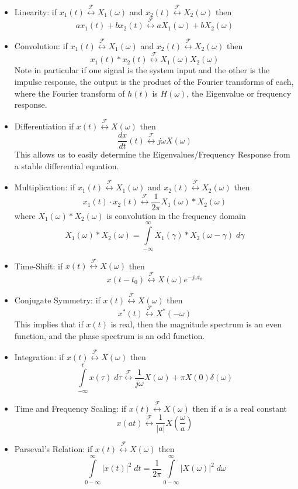 \begin{itemize}
\item Linearity: if $x_1(t) \stackrel{\mathcal{F}}{\longleftrightarrow} X_1(\omega)$ and $x_2(t) \stackrel{\mathcal{F}}{\longleftrightarrow} X_2(\omega)$ then
  \[
  ax_1(t) + bx_2(t) \stackrel{\mathcal{F}}{\longleftrightarrow} aX_1(\omega) + bX_2(\omega)
  \]
\item Convolution: if $x_1(t) \stackrel{\mathcal{F}}{\longleftrightarrow} X_1(\omega)$ and $x_2(t) \stackrel{\mathcal{F}}{\longleftrightarrow} X_2(\omega)$ then
  \[
  x_1(t) * x_2(t) \stackrel{\mathcal{F}}{\longleftrightarrow} X_1(\omega)X_2(\omega)
  \]
  Note in particular if one signal is the system input and the other is the impulse response, the output is the product of the Fourier transforms of each, where the Fourier transform of $h(t)$ is $H(\omega)$, the Eigenvalue or frequency response.
\item Differentiation if $x(t) \stackrel{\mathcal{F}}{\longleftrightarrow} X(\omega)$ then
  \[
  \frac{dx}{dt}(t) \stackrel{\mathcal{F}}{\longleftrightarrow} j\omega X(\omega)
  \]
  This allows us to easily determine the Eigenvalues/Frequency Response from a stable differential equation.
\item Multiplication: if $x_1(t) \stackrel{\mathcal{F}}{\longleftrightarrow} X_1(\omega)$ and $x_2(t) \stackrel{\mathcal{F}}{\longleftrightarrow} X_2(\omega)$ then
  \[
  x_1(t) \cdot x_2(t) \stackrel{\mathcal{F}}{\longleftrightarrow} \frac{1}{2\pi} X_1(\omega)*X_2(\omega)
  \]
  where $X_1(\omega)*X_2(\omega)$ is convolution in the frequency domain
  \[
  X_1(\omega)*X_2(\omega) = \int\limits_{-\infty}^{\infty} X_1(\gamma)*X_2(\omega-\gamma)\;d\gamma 
  \]
\item Time-Shift: if $x(t) \stackrel{\mathcal{F}}{\longleftrightarrow} X(\omega)$ then
  \[
  x(t-t_0) \stackrel{\mathcal{F}}{\longleftrightarrow} X(\omega)e^{-j\omega t_0}
  \]
\item Conjugate Symmetry: if $x(t) \stackrel{\mathcal{F}}{\longleftrightarrow} X(\omega)$ then
  \[
  x^*(t) \stackrel{\mathcal{F}}{\longleftrightarrow} X^*(-\omega)
  \]
  This implies that if $x(t)$ is real, then the magnitude spectrum is an even function, and the phase spectrum is an odd function.

\item Integration: if $x(t) \stackrel{\mathcal{F}}{\longleftrightarrow} X(\omega)$ then
  \[
  \int\limits_{-\infty}^t x(\tau)\; d\tau \stackrel{\mathcal{F}}{\longleftrightarrow} \frac{1}{j\omega} X(\omega) + \pi X(0) \delta(\omega)
  \]
\item Time and Frequency Scaling: if $x(t) \stackrel{\mathcal{F}}{\longleftrightarrow} X(\omega)$ then if $a$ is a real constant
  \[
  x(at) \stackrel{\mathcal{F}}{\longleftrightarrow} \frac{1}{|a|} X\left(\frac{\omega}{a}\right)
  \]
\item Parseval's Relation: if $x(t) \stackrel{\mathcal{F}}{\longleftrightarrow} X(\omega)$ then
  \[
  \int\limits_{0-\infty}^{\infty} |x(t)|^2\; dt =  \frac{1}{2\pi}\int\limits_{0-\infty}^{\infty} |X(\omega)|^2\;d\omega
  \]
\end{itemize}


